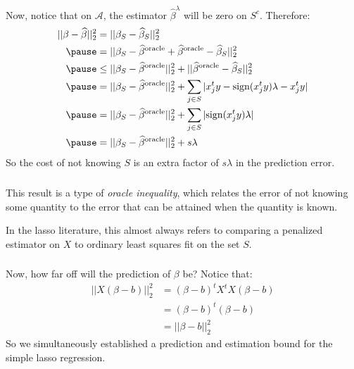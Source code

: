 \begin{frame}[fragile] \frametitle{}

Now, notice that on $\mathcal{A}$, the estimator
$\widehat{\beta}^\lambda$ will be zero on $S^c$. Therefore:
\begin{eqnarray*}
|| \beta - \widehat{\beta} ||_2^2
 &= || \beta_S - \widehat{\beta}_S ||_2^2 \\ \pause
 &= || \beta_S - \widehat{\beta}^{\text{oracle}}  + \widehat{\beta}^{\text{oracle}} - \widehat{\beta}_S ||_2^2 \\ \pause
 &\leq || \beta_S - \widehat{\beta}^{\text{oracle}} ||_2^2  + || \widehat{\beta}^{\text{oracle}} - \widehat{\beta}_S ||_2^2 \\ \pause
 &= || \beta_S - \widehat{\beta}^{\text{oracle}} ||_2^2  + \sum_{j \in S} | x_j^t y - \text{sign} (x_j^t y) \lambda - x_j^t y | \\ \pause
 &= || \beta_S - \widehat{\beta}^{\text{oracle}} ||_2^2  + \sum_{j \in S} |\text{sign} (x_j^t y) \lambda | \\ \pause
 &= || \beta_S - \widehat{\beta}^{\text{oracle}} ||_2^2  + s \lambda \\
\end{eqnarray*}
\pause So the cost of not knowing $S$ is an extra factor of $s \lambda$ in the prediction error.

\end{frame}


\begin{frame}[fragile] \frametitle{}

This result is a type of \textit{oracle inequality}, which
relates the error of not knowing some quantity to the error
that can be attained when the quantity is known.

In the lasso literature, this almost always refers to comparing
a penalized estimator on $X$ to ordinary least squares fit on the
set $S$.

\end{frame}

\begin{frame}[fragile] \frametitle{}

Now, how far off will the prediction of $\beta$ be? Notice that:
\begin{align*}
|| X (\beta - b) ||_2^2 &= (\beta - b)^t X^t X (\beta - b)\\
&= (\beta - b)^t (\beta - b)\\
&= || \beta - b ||_2^2
\end{align*}
So we simultaneously established a prediction and estimation bound
for the simple lasso regression.

\end{frame}

